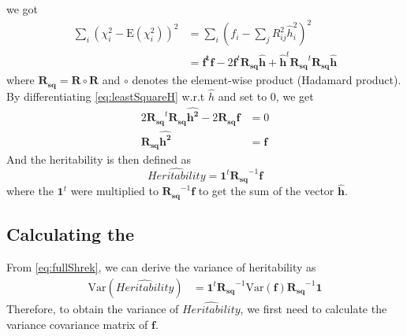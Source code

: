			we got
			\begin{align}
			\sum_i(\chi_i^2-\mathrm{E}(\chi_i^2))^2&=\sum_i(f_i-\sum_j{R^2_{ij}\hat{h}_i^2})^2 \nonumber\\
			&=\boldsymbol{f^tf}-2\boldsymbol{f}^t\boldsymbol{R_{sq}\hat{h}}+\boldsymbol{\hat{h}}^t\boldsymbol{R_{sq}}^t\boldsymbol{R_{sq}\hat{h}}
			\label{eq:leastSquareH}
			\end{align}
			where $\boldsymbol{R_{sq}} = \boldsymbol{R}\circ\boldsymbol{R}$ and $\circ$ denotes the element-wise product (Hadamard product).
			By differentiating \cref{eq:leastSquareH} w.r.t $\hat{h}$ and set to 0, we get
			\begin{align}
				2\boldsymbol{R_{sq}}^t\boldsymbol{R_{sq}}\boldsymbol{\hat{h^2}}-2\boldsymbol{R_{sq}f}&=0 \nonumber\\
				\boldsymbol{R_{sq}}\boldsymbol{\hat{h^2}} &=\boldsymbol{f}
				\label{eq:shrekEq}
			\end{align}
			And the heritability is then defined as 
			\begin{equation}
			\hat{Heritability} = \boldsymbol{1}^t\boldsymbol{R_{sq}}^{-1}\boldsymbol{f}
			\label{eq:fullShrek}
			\end{equation}
			where the $\boldsymbol{1}^t$ were multiplied to $\boldsymbol{R_{sq}}^{-1}\boldsymbol{f}$ to get the sum of the vector $\hat{\boldsymbol{h}}$.
			
		\subsection{Calculating the }
			From \cref{eq:fullShrek}, we can derive the variance of heritability as 
			\begin{align}
				\mathrm{Var}(\hat{Heritability})
				&=\boldsymbol{1}^t\boldsymbol{R_{sq}}^{-1}\mathrm{Var}(\boldsymbol{f})\boldsymbol{R_{sq}}^{-1}\boldsymbol{1}
				\label{eq:varHvarf}
			\end{align}
			Therefore, to obtain the variance of $\hat{Heritability}$, we first need to calculate the variance covariance matrix of $\boldsymbol{f}$.
			
